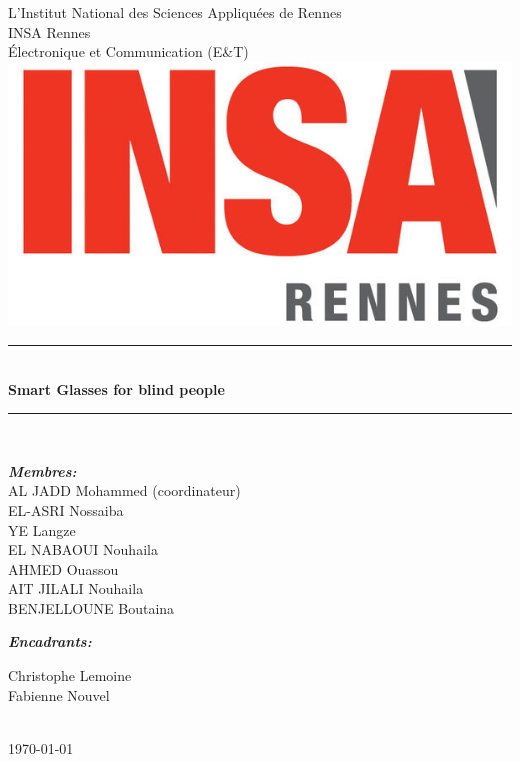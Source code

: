 \documentclass{report}
\begin{document}

\begin{center}

\Huge{L’Institut National des Sciences Appliquées de Rennes}\\[.5cm]
\huge{INSA Rennes}\\[.5cm]

\Large
Électronique et Communication (E\&T)\\[1cm] 
\includegraphics[width=14cm, height=7cm]{4-Images/insa_logo.jpg}\\[0.5cm]

\sffamily
\noindent\rule{15cm}{2pt}\\[0.4cm]
\textbf{\Huge Smart Glasses for blind people}\\[0.2cm] 
\noindent\rule{15cm}{2pt}\\[1cm]
\large
\begin{minipage}[t]{.5\textwidth}
\begin{flushleft}
\emph{\textbf{\Large Membres:}}\\
AL JADD Mohammed (coordinateur)\\
EL-ASRI Nossaiba\\
YE Langze\\
EL NABAOUI Nouhaila\\
AHMED Ouassou \\
AIT JILALI Nouhaila\\
BENJELLOUNE Boutaina\\
\end{flushleft}

\end{minipage}\hfill\begin{minipage}[t]{.4\textwidth}

\begin{flushright}
\emph{\textbf{\Large Encadrants:}}

Christophe Lemoine\\
Fabienne Nouvel\\
\end{flushright}
\end{minipage}
\\[1cm]

{\today}\\[3cm]
\end{center}
\end{document}
